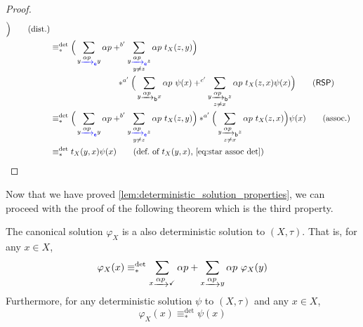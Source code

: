 \documentclass[orivec,envcountsect,envcountsame]{llncs}
\begin{document}
\begin{proof}
\begin{align*}
			\Big)
			\tag{dist.} \\
		&\equiv_*^{\det} \Big(
				\sum_{y \etr{\alpha p} y} \alpha p
				+^{b'} \sum_{\substack{y \etr{\alpha p} z\\y \neq z}} \alpha p ~t_X(z,y)
			\Big) \\ & \hspace{8em}*^{a'} \Big(
				\sum_{y \btr{\alpha p} x} \alpha p~\psi(x)
				+^{c'} \sum_{\substack{y \btr{\alpha p} z\\z \neq x}} \alpha p ~t_X(z,x)\psi(x)
			\Big)
			\tag{\textsf{RSP}} \\
		&\equiv_*^{\det} \Big(
				\sum_{y \etr{\alpha p} y} \alpha p
				+^{b'} \sum_{\substack{y \etr{\alpha p} z\\y \neq z}} \alpha p ~t_X(z,y)
			\Big) *^{a'}\Big(
				\sum_{\substack{y \btr{\alpha p} z\\z \neq x}} \alpha p ~t_X(z,x)
			\Big)\psi(x)
			\tag{assoc.}\\
		&\equiv_*^{\det} t_X(y,x)\psi(x) \tag{def.~of \(t_X(y, x)\), \eqref{eq:star assoc det}} %
	\end{align*}
\end{proof}

Now that we have proved \cref{lem:deterministic_solution_properties}, we can proceed with the proof of the following theorem which is the third property.

\begin{theorem}%
	\label{thm:deterministic_canonical_solution}
	The canonical solution \(\varphi_X\) is a also deterministic solution to \((X,\tau)\).
	That is, for any \(x \in X\),
	\[
	\varphi_X(x) \equiv_*^{\det} \sum_{x\tr{\alpha p} \checkmark} \alpha p + \sum_{x\tr{\alpha p} y} \alpha p~\varphi_X(y)
	\]
	Furthermore, for any deterministic solution \(\psi\) to \((X,\tau)\) and any \(x \in X\),
	\[
	\varphi_X(x) \equiv_*^{\det} \psi(x)
	\]
\end{theorem}
\end{document}
